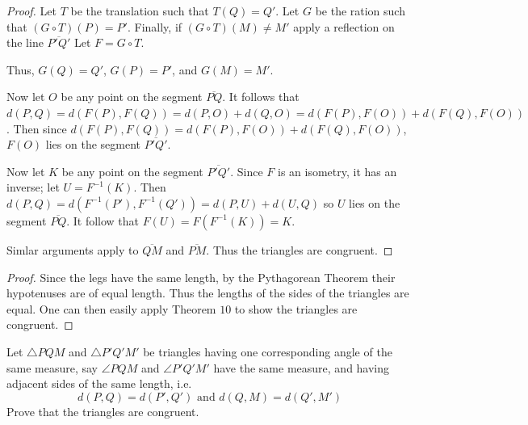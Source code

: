 \begin{proof}
    Let $T$ be the translation such that $T(Q) = Q'$.
    Let $G$ be the ration such that $(G \circ T)(P) = P'$.
    Finally, if $(G \circ T)(M) \not = M'$ apply a reflection on the line $\overline{P'Q'}$
    Let $F = G \circ T$.

    Thus, $G(Q) = Q'$, $G(P) = P'$, and $G(M) = M'$.

    Now let $O$ be any point on the segment $\overline{PQ}$.
    It follows that $d(P, Q) = d(F(P), F(Q)) = d(P, O) + d(Q, O) = d(F(P), F(O)) + d(F(Q), F(O))$.
    Then since $d(F(P), F(Q)) = d(F(P), F(O)) + d(F(Q), F(O))$, $F(O)$ lies on the segment $\overline{P'Q'}$.

    Now let $K$ be any point on the segment $\overline{P'Q'}$.
    Since $F$ is an isometry, it has an inverse; let $U = F^{-1}(K)$.
    Then $d(P, Q) = d(F^{-1}(P'), F^{-1}(Q')) = d(P, U) + d(U, Q)$ so $U$ lies on the segment $\overline{PQ}$.
    It follow that  $F(U) = F(F^{-1}(K)) = K$.

    Simlar arguments apply to $\overline{QM}$ and $\overline{PM}$.
    Thus the triangles are congruent.
\end{proof}

\begin{proof}
    Since the legs have the same length, by the Pythagorean Theorem their hypotenuses are of equal length.
    Thus the lengths of the sides of the triangles are equal.
    One can then easily apply Theorem $10$ to show the triangles are congruent.
\end{proof}

\begin{tcolorbox}[title=Problem 7, breakable]
    Let $\triangle PQM$ and $\triangle P'Q'M'$ be triangles 
        having one corresponding angle of the same measure,
        say $\angle PQM$ and $\angle P'Q'M'$ have the same measure,
        and having adjacent sides of the same length, i.e.
        \[d(P, Q) = d(P', Q') \text{ and } d(Q, M) = d(Q', M')\]
        Prove that the triangles are congruent.
\end{tcolorbox}

